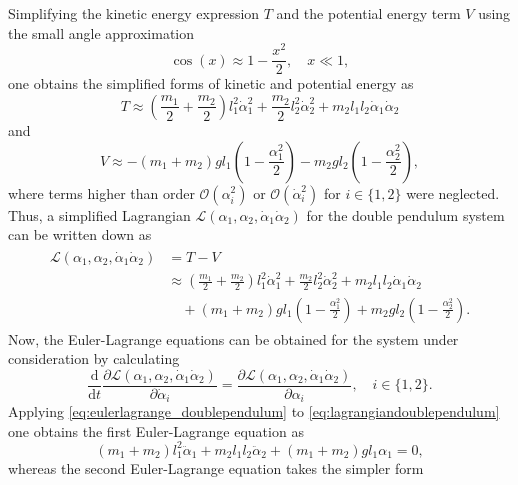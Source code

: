 \documentclass{report}
\numberwithin{tm}{section}
\begin{document}
Simplifying the kinetic energy expression $T$ and the potential energy term $V$ using the small angle approximation \begin{equation}
	\cos(x) \approx 1 - \frac{x^2}{2}, \quad x \ll 1,
\end{equation} one obtains the simplified forms of kinetic and potential energy as \begin{equation}
T \approx \left(\frac{m_1}{2}+ \frac{m_2}{2}\right)l_1^2\dot{\alpha}_1^2 + \frac{m_2}{2}l_2^2\dot{\alpha}_2^2 + m_2l_1l_2\dot{\alpha}_1\dot{\alpha}_2
\end{equation} and \begin{equation}
V \approx -(m_1+m_2)gl_1\left(1-\frac{\alpha_1^2}{2}\right) - m_2gl_2\left(1-\frac{\alpha_2^2}{2}\right),
\end{equation} where terms higher than order $\mathcal{O}(\alpha_i^2)$ or $\mathcal{O}(\dot{\alpha}_i^2)$ for $i \in \{1,2\}$ were neglected. Thus, a simplified Lagrangian $\mathcal{L}(\alpha_1,\alpha_2, \dot{\alpha}_1\dot{\alpha}_2)$ for the double pendulum system can be written down as \begin{align}\label{eq:lagrangiandoublependulum}
\begin{aligned}
	\mathcal{L}(\alpha_1,\alpha_2, \dot{\alpha}_1\dot{\alpha}_2) &= T-V \\
	&\approx \left(\frac{m_1}{2}+ \frac{m_2}{2}\right)l_1^2\dot{\alpha}_1^2  +\frac{m_2}{2}l_2^2\dot{\alpha}_2^2 + m_2l_1l_2\dot{\alpha}_1\dot{\alpha}_2 \\ &\quad + (m_1+m_2)gl_1\left(1-\frac{\alpha_1^2}{2}\right) + m_2gl_2\left(1-\frac{\alpha_2^2}{2}\right).
\end{aligned}
\end{align} Now, the Euler-Lagrange equations can be obtained for the system under consideration by calculating \begin{equation}\label{eq:eulerlagrange_doublependulum}
\frac{\mathrm{d}}{\mathrm{d}t}\frac{\partial \mathcal{L}(\alpha_1,\alpha_2, \dot{\alpha}_1\dot{\alpha}_2)}{\partial \dot{\alpha}_i} = \frac{\partial \mathcal{L}(\alpha_1,\alpha_2, \dot{\alpha}_1\dot{\alpha}_2)}{\partial \alpha_i}, \quad i \in \{1,2\}.
\end{equation} Applying \cref{eq:eulerlagrange_doublependulum} to \cref{eq:lagrangiandoublependulum} one obtains the first Euler-Lagrange equation as \begin{equation}
(m_1+m_2)l_1^2\ddot{\alpha}_1 + m_2l_1l_2\ddot{\alpha}_2 + (m_1+m_2)gl_1\alpha_1 = 0,
\end{equation} whereas the second Euler-Lagrange equation takes the simpler form \begin{equation}

\end{equation}
\end{document}
